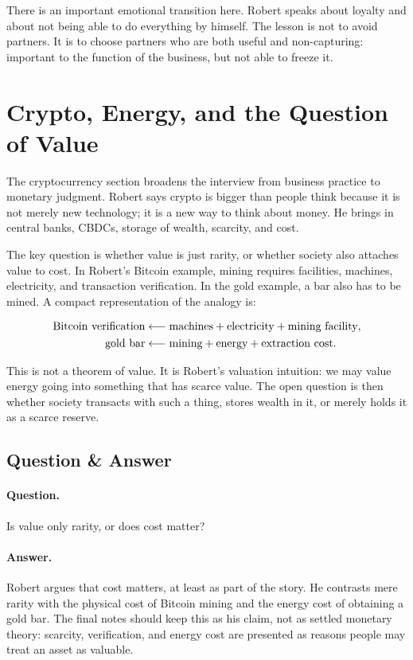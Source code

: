 There is an important emotional transition here. Robert speaks about loyalty and about not being able to do everything by himself. The lesson is not to avoid partners. It is to choose partners who are both useful and non-capturing: important to the function of the business, but not able to freeze it.

\section{Crypto, Energy, and the Question of Value}

The cryptocurrency section broadens the interview from business practice to monetary judgment. Robert says crypto is bigger than people think because it is not merely new technology; it is a new way to think about money. He brings in central banks, CBDCs, storage of wealth, scarcity, and cost.

The key question is whether value is just rarity, or whether society also attaches value to cost. In Robert's Bitcoin example, mining requires facilities, machines, electricity, and transaction verification. In the gold example, a bar also has to be mined. A compact representation of the analogy is:

\begin{align}
\hbox{Bitcoin verification} &\longleftarrow \hbox{machines} + \hbox{electricity} + \hbox{mining facility}, \\
\hbox{gold bar} &\longleftarrow \hbox{mining} + \hbox{energy} + \hbox{extraction cost}.
\end{align}

This is not a theorem of value. It is Robert's valuation intuition: we may value energy going into something that has scarce value. The open question is then whether society transacts with such a thing, stores wealth in it, or merely holds it as a scarce reserve.

\subsection{Question \& Answer}

\paragraph{Question.} Is value only rarity, or does cost matter?

\paragraph{Answer.} Robert argues that cost matters, at least as part of the story. He contrasts mere rarity with the physical cost of Bitcoin mining and the energy cost of obtaining a gold bar. The final notes should keep this as his claim, not as settled monetary theory: scarcity, verification, and energy cost are presented as reasons people may treat an asset as valuable.

